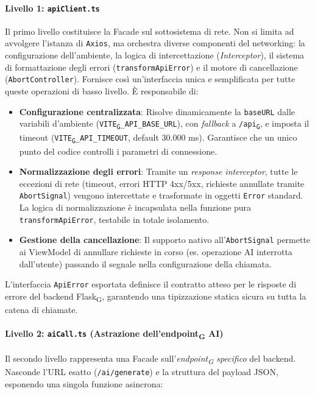 \documentclass[11pt,a4paper]{article}
\newcommand{\gls}[1]{#1\textsubscript{G}}
\begin{document}
\paragraph{Livello 1: \texttt{apiClient.ts}}
Il primo livello costituisce la Facade sul sottosistema di rete. Non si limita ad avvolgere l'istanza di \texttt{Axios}, ma orchestra diverse componenti del networking: la configurazione dell'ambiente, la logica di intercettazione (\textit{Interceptor}), il sistema di formattazione degli errori (\texttt{transformApiError}) e il motore di cancellazione (\texttt{AbortController}). Fornisce così un'interfaccia unica e semplificata per tutte queste operazioni di basso livello. È responsabile di:
\begin{itemize}
    \item \textbf{Configurazione centralizzata}: Risolve dinamicamente la \texttt{baseURL} dalle variabili d'ambiente (\texttt{\gls{VITE}\_API\_BASE\_URL}), con \textit{fallback} a \texttt{/\gls{api}}, e imposta il timeout (\texttt{\gls{VITE}\_API\_TIMEOUT}, default 30.000 ms). Garantisce che un unico punto del codice controlli i parametri di connessione.
    \item \textbf{Normalizzazione degli errori}: Tramite un \textit{response interceptor}, tutte le eccezioni di rete (timeout, errori HTTP 4xx/5xx, richieste annullate tramite \texttt{AbortSignal}) vengono intercettate e trasformate in oggetti \texttt{Error} standard. La logica di normalizzazione è incapsulata nella funzione pura \texttt{transformApiError}, testabile in totale isolamento.
    \item \textbf{Gestione della cancellazione}: Il supporto nativo all'\texttt{AbortSignal} permette ai ViewModel di annullare richieste in corso (es. operazione AI interrotta dall'utente) passando il segnale nella configurazione della chiamata.
\end{itemize}
L'interfaccia \texttt{ApiError} esportata definisce il contratto atteso per le risposte di errore del backend \gls{Flask}, garantendo una tipizzazione statica sicura su tutta la catena di chiamate.

\paragraph{Livello 2: \texttt{aiCall.ts} (Astrazione dell'\gls{endpoint} AI)}
Il secondo livello rappresenta una Facade sull'\textit{\gls{endpoint} specifico} del backend. Nasconde l'URL esatto (\texttt{/ai/generate}) e la struttura del payload JSON, esponendo una singola funzione asincrona:
\end{document}
